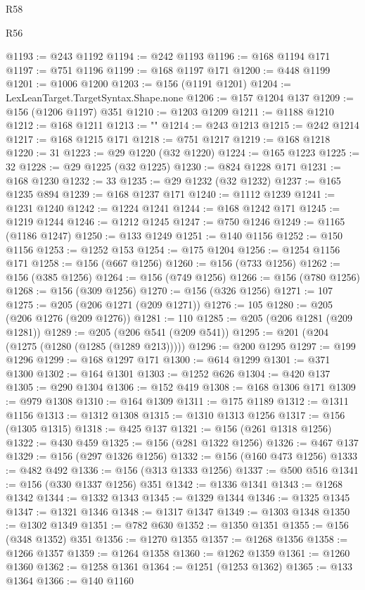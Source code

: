 \begin{lexlean}{R58}
\begin{lexlean}{R56}
\begin{coremodule}
{{{{{{{{{{{{{{{{{{{{{{{{{{{{{{{{{{{{{{{{{{{{{{{{{{{{{{{{{{{{{{{{{{{{{{{{{{{{{{{{{{{{{{{{{{{{{{{{{{{{{{{{{{{{{{{{{{{{{{{{{{{{{{{{{{{{{{{{{{{{{{{{{{{{{{{{{{{{{{{{{{{{{{{{{{{{{{{{{{{{{{{{{{{{{{{{{{{{{{{{{{{{{{{{{{{{@1193 := @243 @1192
@1194 := @242 @1193
@1196 := @168 @1194 @171
@1197 := @751 @1196
@1199 := @168 @1197 @171
@1200 := @448 @1199
@1201 := @1006 @1200
@1203 := @156 (@1191 @1201)
@1204 := LexLeanTarget.TargetSyntax.Shape.none
@1206 := @157 @1204 @137
@1209 := @156 (@1206 @1197) @351
@1210 := @1203 @1209
@1211 := @1188 @1210
@1212 := @168 @1211
@1213 := "}"
@1214 := @243 @1213
@1215 := @242 @1214
@1217 := @168 @1215 @171
@1218 := @751 @1217
@1219 := @168 @1218
@1220 := 31
@1223 := @29 @1220 (@32 @1220)
@1224 := @165 @1223
@1225 := 32
@1228 := @29 @1225 (@32 @1225)
@1230 := @824 @1228 @171
@1231 := @168 @1230
@1232 := 33
@1235 := @29 @1232 (@32 @1232)
@1237 := @165 @1235 @894
@1239 := @168 @1237 @171
@1240 := @1112 @1239
@1241 := @1231 @1240
@1242 := @1224 @1241
@1244 := @168 @1242 @171
@1245 := @1219 @1244
@1246 := @1212 @1245
@1247 := @750 @1246
@1249 := @1165 (@1186 @1247)
@1250 := @133 @1249
@1251 := @140 @1156
@1252 := @150 @1156
@1253 := @1252 @153
@1254 := @175 @1204
@1256 := @1254 @1156 @171
@1258 := @156 (@667 @1256)
@1260 := @156 (@733 @1256)
@1262 := @156 (@385 @1256)
@1264 := @156 (@749 @1256)
@1266 := @156 (@780 @1256)
@1268 := @156 (@309 @1256)
@1270 := @156 (@326 @1256)
@1271 := 107
@1275 := @205 (@206 @1271 (@209 @1271))
@1276 := 105
@1280 := @205 (@206 @1276 (@209 @1276))
@1281 := 110
@1285 := @205 (@206 @1281 (@209 @1281))
@1289 := @205 (@206 @541 (@209 @541))
@1295 := @201 (@204 (@1275 (@1280 (@1285 (@1289 @213)))))
@1296 := @200 @1295
@1297 := @199 @1296
@1299 := @168 @1297 @171
@1300 := @614 @1299
@1301 := @371 @1300
@1302 := @164 @1301
@1303 := @1252 @626
@1304 := @420 @137
@1305 := @290 @1304
@1306 := @152 @419
@1308 := @168 @1306 @171
@1309 := @979 @1308
@1310 := @164 @1309
@1311 := @175 @1189
@1312 := @1311 @1156
@1313 := @1312 @1308
@1315 := @1310 @1313 @1256
@1317 := @156 (@1305 @1315)
@1318 := @425 @137
@1321 := @156 (@261 @1318 @1256)
@1322 := @430 @459
@1325 := @156 (@281 @1322 @1256)
@1326 := @467 @137
@1329 := @156 (@297 @1326 @1256)
@1332 := @156 (@160 @473 @1256)
@1333 := @482 @492
@1336 := @156 (@313 @1333 @1256)
@1337 := @500 @516
@1341 := @156 (@330 @1337 @1256) @351
@1342 := @1336 @1341
@1343 := @1268 @1342
@1344 := @1332 @1343
@1345 := @1329 @1344
@1346 := @1325 @1345
@1347 := @1321 @1346
@1348 := @1317 @1347
@1349 := @1303 @1348
@1350 := @1302 @1349
@1351 := @782 @630
@1352 := @1350 @1351
@1355 := @156 (@348 @1352) @351
@1356 := @1270 @1355
@1357 := @1268 @1356
@1358 := @1266 @1357
@1359 := @1264 @1358
@1360 := @1262 @1359
@1361 := @1260 @1360
@1362 := @1258 @1361
@1364 := @1251 (@1253 @1362)
@1365 := @133 @1364
@1366 := @140 @1160
}}}}}}}}}}}}}}}}}}}}}}}}}}}}}}}}}}}}}}}}}}}}}}}}}}}}}}}}}}}}}}}}}}}}}}}}}}}}}}}}}}}}}}}}}}}}}}}}}}}}}}}}}}}}}}}}}}}}}}}}}}}}}}}}}}}}}}}}}}}}}}}}}}}}}}}}}}}}}}}}}}}}}}}}}}}}}}}}}}}}}}}}}}}}}}}}}}}}}}}}}}}}}}}}}}}
\end{coremodule}
\end{lexlean}
\end{lexlean}
